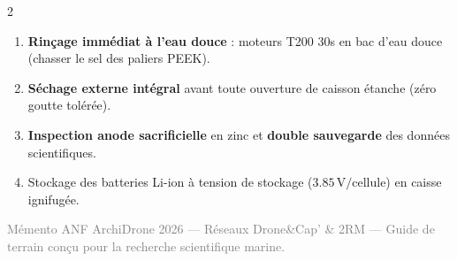 \documentclass[a4paper,10pt]{article}
\begin{document}
\begin{multicols}{2}
\begin{tcolorbox}[title={13. Règles d'Or : Après Récupération}]
  \scriptsize
  \begin{enumerate}
    \item \textbf{Rinçage immédiat à l'eau douce} : moteurs T200 30s en bac d'eau douce (chasser le sel des paliers PEEK).
    \item \textbf{Séchage externe intégral} avant toute ouverture de caisson étanche (zéro goutte tolérée).
    \item \textbf{Inspection anode sacrificielle} en zinc et \textbf{double sauvegarde} des données scientifiques.
    \item Stockage des batteries Li-ion à tension de stockage ($3.85\,\text{V/cellule}$) en caisse ignifugée.
  \end{enumerate}
\end{tcolorbox}

\end{multicols}

\vspace{-6pt}
\begin{center}
  \scriptsize\textcolor{gray}{Mémento ANF ArchiDrone 2026 --- Réseaux Drone\&Cap' \& 2RM --- Guide de terrain conçu pour la recherche scientifique marine.}
\end{center}
\end{document}
